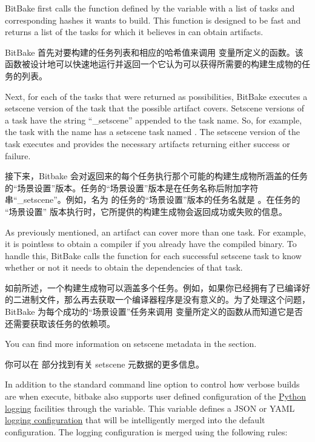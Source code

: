 BitBake first calls the function defined by the  variable with a list of tasks and corresponding hashes it wants to build. This function is designed to be fast and returns a list of the tasks for which it believes in can obtain artifacts.

BitBake 首先对要构建的任务列表和相应的哈希值来调用  变量所定义的函数。该函数被设计地可以快速地运行并返回一个它认为可以获得所需要的构建生成物的任务的列表。

Next, for each of the tasks that were returned as possibilities, BitBake executes a setscene version of the task that the possible artifact covers. Setscene versions of a task have the string ``\_setscene'' appended to the task name. So, for example, the task with the name  has a setscene task named . The setscene version of the task executes and provides the necessary artifacts returning either success or failure.

接下来，Bitbake 会对返回来的每个任务执行那个可能的构建生成物所涵盖的任务的``场景设置''版本。任务的``场景设置''版本是在任务名称后附加字符串``\_setscene''。例如，名为  的任务的``场景设置''版本的任务名就是 。在任务的 ``场景设置'' 版本执行时，它所提供的构建生成物会返回成功或失败的信息。

As previously mentioned, an artifact can cover more than one task. For example, it is pointless to obtain a compiler if you already have the compiled binary. To handle this, BitBake calls the  function for each successful setscene task to know whether or not it needs to obtain the dependencies of that task.

如前所述，一个构建生成物可以涵盖多个任务。例如，如果你已经拥有了已编译好的二进制文件，那么再去获取一个编译器程序是没有意义的。为了处理这个问题，BitBake 为每个成功的``场景设置''任务来调用\linebreak {} 变量所定义的函数从而知道它是否还需要获取该任务的依赖项。

You can find more information on setscene metadata in the  section.

你可以在  部分找到有关 setscene 元数据的更多信息。

\label{section:Logging}

In addition to the standard command line option to control how verbose builds are when execute, bitbake also supports user defined configuration of the \href{https://docs.python.org/3/library/logging.html}{Python logging} facilities through the  variable. This variable defines a JSON or YAML \href{https://docs.python.org/3/library/logging.config.html}{logging configuration} that will be intelligently merged into the default configuration. The logging configuration is merged using the following rules:

